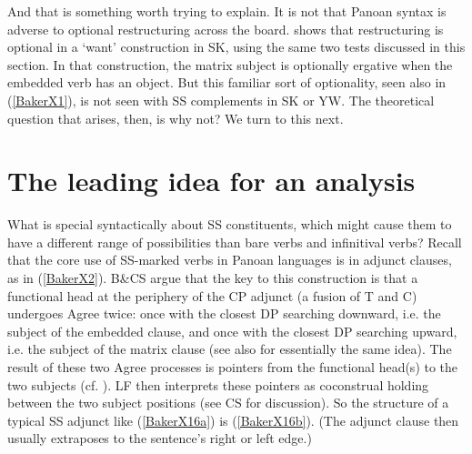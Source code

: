 \documentclass[output=paper]{langscibook}
\begin{document}
And that is something worth trying to explain. It is not that Panoan syntax is adverse to optional restructuring across the board. \citet[371--376]{baker2014dependent} shows that restructuring is optional in a ‘want’ construction in SK, using the same two tests discussed in this section. In that construction, the matrix subject is optionally ergative when the embedded verb has an object. But this familiar sort of optionality, seen also in (\ref{BakerX1}), is not seen with SS complements in SK or YW. The theoretical question that arises, then, is why not? We turn to this next.

\section{The leading idea for an analysis}\label{sec:baker:4}

What is special syntactically about SS constituents, which might cause them to have a different range of possibilities than bare verbs and infinitival verbs? Recall that the core use of SS-marked verbs in Panoan languages is in adjunct clauses, as in (\ref{BakerX2}). B\&CS argue that the key to this construction is that a functional head at the periphery of the CP adjunct (a fusion of T and C) undergoes Agree twice: once with the closest DP searching downward, i.e. the subject of the embedded clause, and once with the closest DP searching upward, i.e. the subject of the matrix clause (see also \citet{arregi2019mark} for essentially the same idea). The result of these two Agree processes is pointers from the functional head(s) to the two subjects (cf. \citealt{arregi2012morphotactics}). LF then interprets these pointers as coconstrual holding between the two subject positions (see CS for discussion). So the structure of a typical SS adjunct like (\ref{BakerX16a}) is (\ref{BakerX16b}). (The adjunct clause then usually extraposes to the sentence’s right or left edge.)
\end{document}

